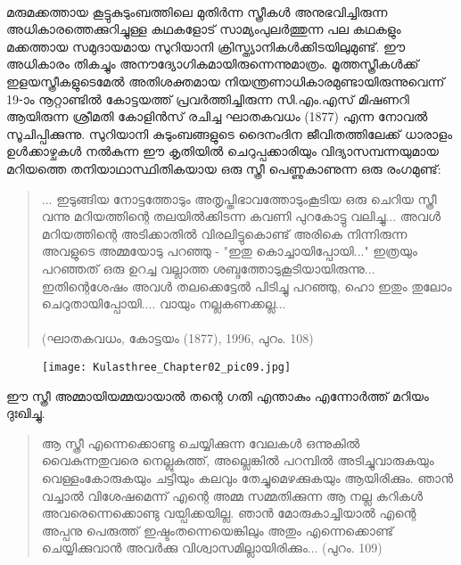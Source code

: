\paragraph{}മരുമക്കത്തായ കൂട്ടുകുടുംബത്തിലെ മുതിർന്ന സ്ത്രീകൾ അനുഭവിച്ചിരുന്ന അധികാരത്തെക്കുറിച്ചുള്ള കഥകളോട് സാമ്യംപുലർത്തുന്ന പല കഥകളും മക്കത്തായ സമുദായമായ സുറിയാനി ക്രിസ്ത്യാനികൾക്കിടയിലുമുണ്ട്. ഈ അധികാരം തികച്ചും അനൗദ്യോഗികമായിരുന്നെന്നുമാത്രം. മൂത്തസ്ത്രീകൾക്ക് ഇളയസ്ത്രീകളുടെമേൽ അതിശക്തമായ നിയന്ത്രണാധികാരമുണ്ടായിരുന്നുവെന്ന് 19-ാം നൂറ്റാണ്ടിൽ കോട്ടയത്ത് പ്രവർത്തിച്ചിരുന്ന സി.എം.എസ് മിഷണറി ആയിരുന്ന ശ്രീമതി കോളിൻസ് രചിച്ച ഘാതകവധം (1877) എന്ന നോവൽ സൂചിപ്പിക്കുന്നു. സുറിയാനി കുടുംബങ്ങളുടെ ദൈനംദിന ജീവിതത്തിലേക്ക് ധാരാളം ഉൾക്കാഴ്ചകൾ നൽകുന്ന ഈ കൃതിയിൽ ചെറുപ്പക്കാരിയും വിദ്യാസമ്പന്നയുമായ മറിയത്തെ തനിയാഥാസ്ഥിതികയായ ഒരു സ്ത്രീ പെണ്ണുകാണുന്ന ഒരു രംഗമുണ്ട്:
\begin{quotation}
\noindent... ഇടുങ്ങിയ നോട്ടത്തോടും അതൃപ്തിഭാവത്തോടുംകൂടിയ ഒരു ചെറിയ സ്ത്രീ വന്നു മറിയത്തിന്റെ തലയിൽക്കിടന്ന കവണി പുറകോട്ടു വലിച്ചു... അവൾ മറിയത്തിന്റെ അടിക്കാതിൽ വിരലിട്ടുകൊണ്ട് അരികെ നിന്നിരുന്ന അവളുടെ അമ്മയോടു പറഞ്ഞു - "ഇതു കൊച്ചായിപ്പോയി..." ഇത്രയും പറഞ്ഞത് ഒരു ഉറച്ച വല്ലാത്ത ശബ്ദത്തോടുകൂടിയായിരുന്നു... ഇതിന്റെശേഷം അവൾ തലക്കെട്ടേൽ പിടിച്ചു പറഞ്ഞു, ഹൊ ഇതും തുലോം ചെറുതായിപ്പോയി.... വായും നല്ലകണക്കല്ല...\\
\\(ഘാതകവധം, കോട്ടയം (1877), 1996, പുറം. 108)
\end{quotation}
\begin{figure}[h]
\begin{center}
\texttt{[image: Kulasthree\_Chapter02\_pic09.jpg]}
\end{center}
\end{figure}


ഈ സ്ത്രീ അമ്മായിയമ്മയായാൽ തന്റെ ഗതി എന്താകും എന്നോർത്ത് മറിയം ദുഃഖിച്ചു.
\begin{quotation}
\noindent ആ സ്ത്രീ എന്നെക്കൊണ്ടു ചെയ്യിക്കുന്ന വേലകൾ ഒന്നുകിൽ വൈകുന്നതുവരെ നെല്ലുകുത്ത്, അല്ലെങ്കിൽ പറമ്പിൽ അടിച്ചുവാരുകയും വെള്ളംകോരുകയും ചട്ടിയും കലവും തേച്ചുമെഴക്കുകയും ആയിരിക്കും. ഞാൻ വച്ചാൽ വിശേഷമെന്ന് എന്റെ അമ്മ സമ്മതിക്കുന്ന ആ നല്ല കറികൾ അവരെന്നെക്കൊണ്ടു വയ്പിക്കയില്ല. ഞാൻ മോരുകാച്ചിയാൽ എന്റെ അപ്പനു പെരുത്ത് ഇഷ്ടംതന്നെയെങ്കിലും അതും എന്നെക്കൊണ്ട് ചെയ്യിക്കുവാൻ അവർക്കു വിശ്വാസമില്ലായിരിക്കും... (പുറം. 109)
\end{quotation}

